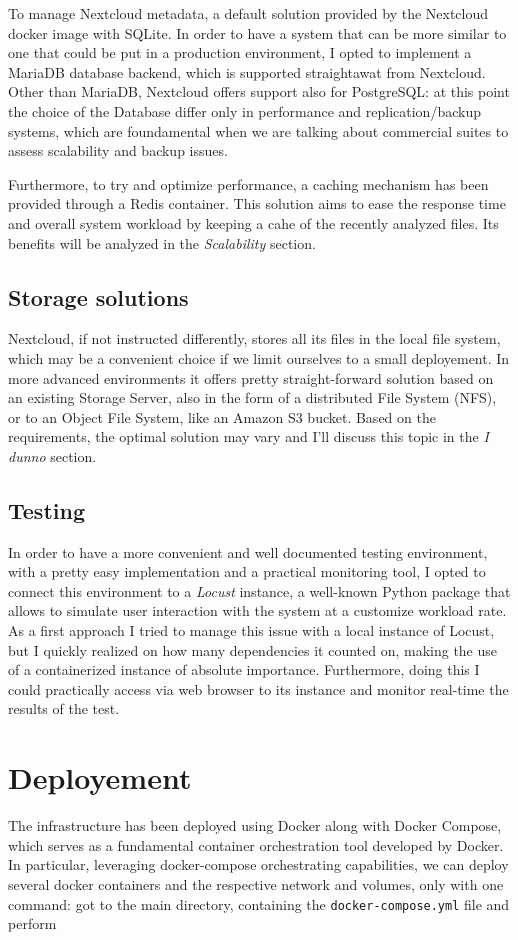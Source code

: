 \documentclass{article}
\begin{document}
	To manage Nextcloud metadata, a default solution provided by the Nextcloud docker image with SQLite. In order to have a system that can be more similar to one that could be put in a production environment, I opted to implement a MariaDB database backend, which is supported straightawat from Nextcloud. Other than MariaDB, Nextcloud offers support also for PostgreSQL: at this point the choice of the Database differ only in performance and replication/backup systems, which are foundamental when we are talking about commercial suites to assess scalability and backup issues.
	
	Furthermore, to try and optimize performance, a caching mechanism has been provided through a Redis container. This solution aims to ease the response time and overall system workload by keeping a cahe of the recently analyzed files. Its benefits will be analyzed in the \textit{Scalability} section.
	
	\subsection{Storage solutions}
	Nextcloud, if not instructed differently, stores all its files in the local file system, which may be a convenient choice if we limit ourselves to a small deployement. In more advanced environments it offers pretty straight-forward solution based on an existing Storage Server, also in the form of a distributed File System (NFS), or to an Object File System, like an Amazon S3 bucket. Based on the requirements, the optimal solution may vary and I'll discuss this topic in the \textit{I dunno} section.
	
	\subsection{Testing}
	In order to have a more convenient and well documented testing environment, with a pretty easy implementation and a practical monitoring tool, I opted to connect this environment to a \textit{Locust} instance, a well-known Python package that allows to simulate user interaction with the system at a customize workload rate. As a first approach I tried to manage this issue with a local instance of Locust, but I quickly realized on how many dependencies it counted on, making the use of a containerized instance of absolute importance. Furthermore, doing this I could practically access via web browser to its instance and monitor real-time the results of the test.
	
	\section{Deployement}
	The infrastructure has been deployed using Docker along with Docker Compose, which serves as a fundamental container orchestration tool developed by Docker. %
	In particular, leveraging docker-compose orchestrating capabilities, we can deploy several docker containers and the respective network and volumes, only with one command: got to the main directory, containing the \verb|docker-compose.yml| file and perform
	
\end{document}
